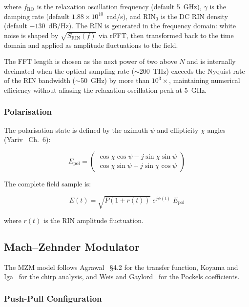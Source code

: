 \documentclass[11pt,a4paper]{article}
\begin{document}
where $f_{\text{RO}}$ is the relaxation oscillation frequency (default 5~GHz),
$\gamma$ is the damping rate (default $1.88\times10^{10}$~rad/s), and
$\text{RIN}_0$ is the DC RIN density (default $-130$~dB/Hz).
The RIN is generated in the frequency domain: white noise is shaped by
$\sqrt{S_{\text{RIN}}(f)}$ via rFFT, then transformed back to the time domain
and applied as amplitude fluctuations to the field.

The FFT length is chosen as the next power of two above $N$ and is
internally decimated when the optical sampling rate ($\sim$200~THz)
exceeds the Nyquist rate of the RIN bandwidth ($\sim$50~GHz) by more
than $10^3\times$, maintaining numerical efficiency without aliasing
the relaxation-oscillation peak at 5~GHz.

\subsubsection{Polarisation}

The polarisation state is defined by the azimuth $\psi$ and ellipticity
$\chi$ angles (Yariv~\cite{yariv} Ch.~6):

\begin{equation}
  E_{\text{pol}} = \begin{pmatrix}
    \cos\chi\cos\psi - j\sin\chi\sin\psi \\
    \cos\chi\sin\psi + j\sin\chi\cos\psi
  \end{pmatrix}
\end{equation}

The complete field sample is:

\begin{equation}
  E(t) = \sqrt{P(1 + r(t))} \; e^{j\phi(t)} \; E_{\text{pol}}
\end{equation}

where $r(t)$ is the RIN amplitude fluctuation.

\subsection{Mach--Zehnder Modulator}

The MZM model follows Agrawal~\cite{agrawal5} \S4.2 for the transfer
function, Koyama and Iga~\cite{koyama} for the chirp analysis, and
Weis and Gaylord~\cite{weis} for the Pockels coefficients.

\subsubsection{Push-Pull Configuration}
\end{document}
